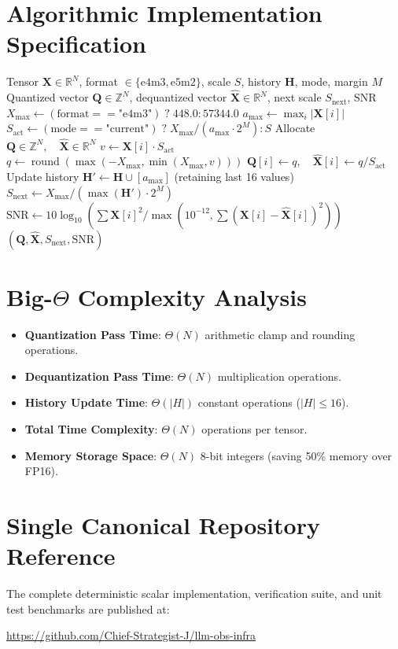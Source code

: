\documentclass[11pt,a4paper]{article}
\theoremstyle{definition}
\begin{document}
\section{Algorithmic Implementation Specification}

\begin{algorithm}[H]
\caption{FP8 Delayed Quantization and Dynamic Scale Update}
\begin{algorithmic}[1]
\Require Tensor $\mathbf{X} \in \mathbb{R}^N$, format $\in \{\text{e4m3}, \text{e5m2}\}$, scale $S$, history $\mathbf{H}$, mode, margin $M$
\Ensure Quantized vector $\mathbf{Q} \in \mathbb{Z}^N$, dequantized vector $\hat{\mathbf{X}} \in \mathbb{R}^N$, next scale $S_{\text{next}}$, SNR
\State $X_{\max} \gets (\text{format} == \text{"e4m3"}) \; ? \; 448.0 : 57344.0$
\State $a_{\max} \gets \max_{i} |\mathbf{X}[i]|$
\State $S_{\text{act}} \gets (\text{mode} == \text{"current"}) \; ? \; X_{\max} / (a_{\max} \cdot 2^M) : S$
\State Allocate $\mathbf{Q} \in \mathbb{Z}^N, \quad \hat{\mathbf{X}} \in \mathbb{R}^N$
    \State $v \gets \mathbf{X}[i] \cdot S_{\text{act}}$
    \State $q \gets \operatorname{round}(\max(-X_{\max}, \min(X_{\max}, v)))$
    \State $\mathbf{Q}[i] \gets q, \quad \hat{\mathbf{X}}[i] \gets q / S_{\text{act}}$
\EndFor
\State Update history $\mathbf{H}' \gets \mathbf{H} \cup [a_{\max}]$ (retaining last 16 values)
\State $S_{\text{next}} \gets X_{\max} / (\max(\mathbf{H}') \cdot 2^M)$
\State $\text{SNR} \gets 10 \log_{10}\left( \sum \mathbf{X}[i]^2 / \max(10^{-12}, \sum (\mathbf{X}[i] - \hat{\mathbf{X}}[i])^2) \right)$
\State \Return $(\mathbf{Q}, \hat{\mathbf{X}}, S_{\text{next}}, \text{SNR})$
\end{algorithmic}
\end{algorithm}

\section{Big-$\Theta$ Complexity Analysis}

\begin{itemize}
    \item \textbf{Quantization Pass Time}: $\Theta(N)$ arithmetic clamp and rounding operations.
    \item \textbf{Dequantization Pass Time}: $\Theta(N)$ multiplication operations.
    \item \textbf{History Update Time}: $\Theta(|H|)$ constant operations ($|H| \le 16$).
    \item \textbf{Total Time Complexity}: $\Theta(N)$ operations per tensor.
    \item \textbf{Memory Storage Space}: $\Theta(N)$ 8-bit integers (saving 50\% memory over FP16).
\end{itemize}

\section{Single Canonical Repository Reference}

The complete deterministic scalar implementation, verification suite, and unit test benchmarks are published at:
\begin{center}
\url{https://github.com/Chief-Strategist-J/llm-obs-infra}
\end{center}
\end{document}
